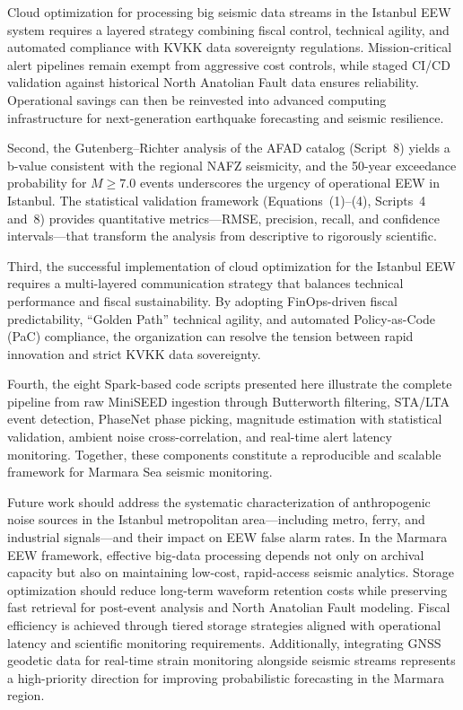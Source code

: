 \documentclass[data,article,accept,pdftex,moreauthors]{Definitions/mdpi}
\begin{document}
Cloud optimization for processing big seismic data streams in the Istanbul EEW system requires a layered strategy combining fiscal control, technical agility, and automated compliance with KVKK data sovereignty regulations. Mission-critical alert pipelines remain exempt from aggressive cost controls, while staged CI/CD validation against historical North Anatolian Fault data ensures reliability. Operational savings can then be reinvested into advanced computing infrastructure for next-generation earthquake forecasting and seismic resilience.

Second, the Gutenberg--Richter analysis of the AFAD catalog (Script~8) yields a b-value consistent with the regional NAFZ seismicity, and the 50-year exceedance probability for $M \geq 7.0$ events underscores the urgency of operational EEW in Istanbul. The statistical validation framework (Equations~(1)--(4), Scripts~4 and~8) provides quantitative metrics---RMSE, precision, recall, and confidence intervals---that transform the analysis from descriptive to rigorously scientific.

Third, the successful implementation of cloud optimization for the Istanbul EEW requires a multi-layered communication strategy that balances technical performance and fiscal sustainability. By adopting FinOps-driven fiscal predictability, ``Golden Path'' technical agility, and automated Policy-as-Code (PaC) compliance, the organization can resolve the tension between rapid innovation and strict KVKK data sovereignty.

Fourth, the eight Spark-based code scripts presented here illustrate the complete pipeline from raw MiniSEED ingestion through Butterworth filtering, STA/LTA event detection, PhaseNet phase picking, magnitude estimation with statistical validation, ambient noise cross-correlation, and real-time alert latency monitoring. Together, these components constitute a reproducible and scalable framework for Marmara Sea seismic monitoring.

Future work should address the systematic characterization of anthropogenic noise sources in the Istanbul metropolitan area---including metro, ferry, and industrial signals---and their impact on EEW false alarm rates. In the Marmara EEW framework, effective big-data processing depends not only on archival capacity but also on maintaining low-cost, rapid-access seismic analytics. Storage optimization should reduce long-term waveform retention costs while preserving fast retrieval for post-event analysis and North Anatolian Fault modeling. Fiscal efficiency is achieved through tiered storage strategies aligned with operational latency and scientific monitoring requirements. Additionally, integrating GNSS geodetic data for real-time strain monitoring alongside seismic streams represents a high-priority direction for improving probabilistic forecasting in the \linebreak Marmara region.
\end{document}
